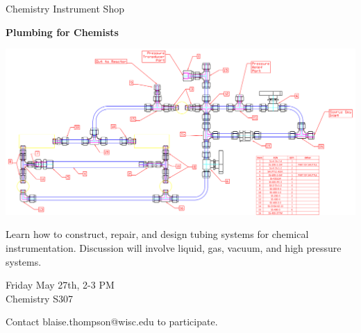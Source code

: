 \documentclass{article}
\begin{document}
\center

\Huge

Chemistry Instrument Shop

\textbf{
Plumbing for Chemists
}

\includegraphics[width=\linewidth]{coverart.png}

{
\huge
Learn how to construct, repair, and design tubing systems for chemical instrumentation.
Discussion will involve liquid, gas, vacuum, and high pressure systems.
}

\vfill

{
\huge
Friday May 27th, 2-3 PM \\
Chemistry S307
}

\vfill

{
\huge
Contact blaise.thompson@wisc.edu to participate.
}
\end{document}
